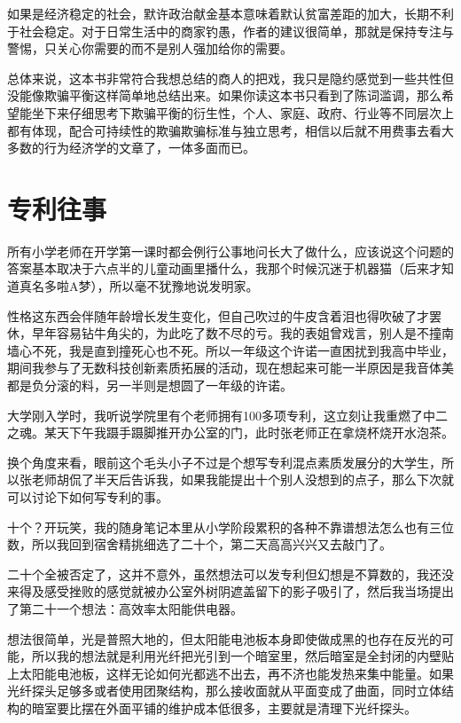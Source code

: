 \documentclass[
]{book}
\begin{document}
如果是经济稳定的社会，默许政治献金基本意味着默认贫富差距的加大，长期不利于社会稳定。对于日常生活中的商家钓愚，作者的建议很简单，那就是保持专注与警惕，只关心你需要的而不是别人强加给你的需要。

总体来说，这本书非常符合我想总结的商人的把戏，我只是隐约感觉到一些共性但没能像欺骗平衡这样简单地总结出来。如果你读这本书只看到了陈词滥调，那么希望能坐下来仔细思考下欺骗平衡的衍生性，个人、家庭、政府、行业等不同层次上都有体现，配合可持续性的欺骗欺骗标准与独立思考，相信以后就不用费事去看大多数的行为经济学的文章了，一体多面而已。

\hypertarget{ux4e13ux5229ux5f80ux4e8b}{%
\section{专利往事}\label{ux4e13ux5229ux5f80ux4e8b}}

所有小学老师在开学第一课时都会例行公事地问长大了做什么，应该说这个问题的答案基本取决于六点半的儿童动画里播什么，我那个时候沉迷于机器猫（后来才知道真名多啦A梦），所以毫不犹豫地说发明家。

性格这东西会伴随年龄增长发生变化，但自己吹过的牛皮含着泪也得吹破了才罢休，早年容易钻牛角尖的，为此吃了数不尽的亏。我的表姐曾戏言，别人是不撞南墙心不死，我是直到撞死心也不死。所以一年级这个许诺一直困扰到我高中毕业，期间我参与了无数科技创新素质拓展的活动，现在想起来可能一半原因是我音体美都是负分滚的料，另一半则是想圆了一年级的许诺。

大学刚入学时，我听说学院里有个老师拥有100多项专利，这立刻让我重燃了中二之魂。某天下午我蹑手蹑脚推开办公室的门，此时张老师正在拿烧杯烧开水泡茶。

换个角度来看，眼前这个毛头小子不过是个想写专利混点素质发展分的大学生，所以张老师胡侃了半天后告诉我，如果我能提出十个别人没想到的点子，那么下次就可以讨论下如何写专利的事。

十个？开玩笑，我的随身笔记本里从小学阶段累积的各种不靠谱想法怎么也有三位数，所以我回到宿舍精挑细选了二十个，第二天高高兴兴又去敲门了。

二十个全被否定了，这并不意外，虽然想法可以发专利但幻想是不算数的，我还没来得及感受挫败的感觉就被办公室外树阴遮盖留下的影子吸引了，然后我当场提出了第二十一个想法：高效率太阳能供电器。

想法很简单，光是普照大地的，但太阳能电池板本身即使做成黑的也存在反光的可能，所以我的想法就是利用光纤把光引到一个暗室里，然后暗室是全封闭的内壁贴上太阳能电池板，这样无论如何光都逃不出去，再不济也能发热来集中能量。如果光纤探头足够多或者使用团聚结构，那么接收面就从平面变成了曲面，同时立体结构的暗室要比摆在外面平铺的维护成本低很多，主要就是清理下光纤探头。
\end{document}
